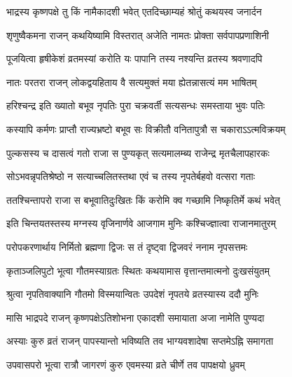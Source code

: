 \label{sec:padma-bhadrapada-krishnaja}

\ganapatyadiDhyanam
\padmaPuranam



\twolineshloka
{भाद्रस्य कृष्णपक्षे तु किं नामैकादशी भवेत्}
{एतदिच्छाम्यहं श्रोतुं कथयस्व जनार्दन}%


\twolineshloka
{शृणुष्वैकमना राजन् कथयिष्यामि विस्तरात्}
{अजेति नामतः प्रोक्ता सर्वपापप्रणाशिनी}%

\twolineshloka
{पूजयित्वा हृषीकेशं व्रतमस्यां करोति यः}
{पापानि तस्य नश्यन्ति व्रतस्य श्रवणादपि}%

\twolineshloka
{नातः परतरा राजन् लोकद्वयहिताय वै}
{सत्यमुक्तं मया ह्येतन्नासत्यं मम भाषितम्}%

\twolineshloka
{हरिश्चन्द्र इति ख्यातो बभूव नृपतिः पुरा}
{चक्रवर्ती सत्यसन्धः समस्ताया भुवः पतिः}%

\twolineshloka
{कस्यापि कर्मणः प्राप्तौ राज्यभ्रष्टो बभूव सः}
{विक्रीतौ वनितापुत्रौ स चकाराऽऽत्मविक्रयम्}%

\twolineshloka
{पुल्कसस्य च दासत्वं गतो राजा स पुण्यकृत्}
{सत्यमालम्ब्य राजेन्द्र मृतचैलापहारकः}%

\twolineshloka
{सोऽभवन्नृपतिश्रेष्ठो न सत्याच्चलितस्तथा}
{एवं च तस्य नृपतेर्बहवो वत्सरा गताः}%

\twolineshloka
{ततश्चिन्तापरो राजा स बभूवातिदुःखितः}
{किं करोमि क्व गच्छामि निष्कृतिर्मे कथं भवेत्}%

\twolineshloka
{इति चिन्तयतस्तस्य मग्नस्य वृजिनार्णवे}
{आजगाम मुनिः कश्चिज्ज्ञात्वा राजानमातुरम्}%

\twolineshloka
{परोपकरणार्थाय निर्मितो ब्रह्मणा द्विजः}
{स तं दृष्ट्वा द्विजवरं ननाम नृपसत्तमः}%

\twolineshloka
{कृताञ्जलिपुटो भूत्वा गौतमस्याग्रतः स्थितः}
{कथयामास वृत्तान्तमात्मनो दुःखसंयुतम्}%

\twolineshloka
{श्रुत्वा नृपतिवाक्यानि गौतमो विस्मयान्वितः}
{उपदेशं नृपतये व्रतस्यास्य ददौ मुनिः}%

\twolineshloka
{मासि भाद्रपदे राजन् कृष्णपक्षेऽतिशोभना}
{एकादशी समायाता  अजा नामेति पुण्यदा}%

\twolineshloka
{अस्याः कुरु व्रतं राजन् पापस्यान्तो भविष्यति}
{तव भाग्यवशादेषा सप्तमेऽह्नि समागता}%

\twolineshloka
{उपवासपरो भूत्वा रात्रौ जागरणं कुरु}
{एवमस्या व्रते चीर्णे तव पापक्षयो ध्रुवम्}%

